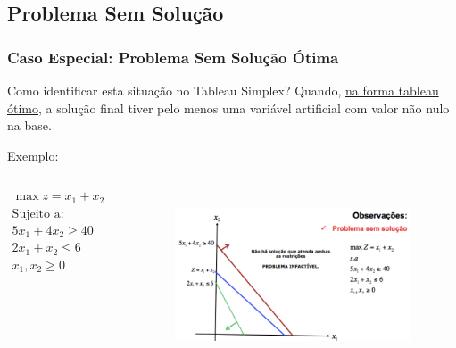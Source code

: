 \documentclass{beamer}
\begin{document}
\subsection{Problema Sem Solução}
\begin{frame}
	\frametitle{Caso Especial: Problema Sem Solução Ótima}
	\begin{block}{Como identificar esta situação no Tableau Simplex?}
		Quando, {\color{red} \underline{na forma tableau ótimo}}, a solução final tiver pelo menos uma variável artificial com valor não nulo na base. 	
	\end{block}
	\underline{Exemplo}:
	\begin{columns}
		\begin{column}{4cm}
			\begin{mdframed}[backgroundcolor=black!10]
				$	\begin{matrix}
						\max z = x_1 + x_2\\
						\text{Sujeito a:} \\
						5x_1 + 4x_2 \ge 40 \\
						2x_1 + x_2 \le 6 \\
						x_1, x_2 \ge 0 \\
					\end{matrix}
				$
			\end{mdframed}
		\end{column} \pause
		\begin{column}{6.5cm}
			\includegraphics[width=7cm,height=5cm]{prob_semsol.png}
		\end{column}
	\end{columns}
\end{frame}
\end{document}
